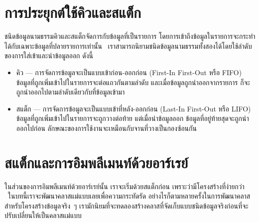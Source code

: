 \section{การ{\wbr}ประยุกต์{\wbr}ใช้{\wbr}คิว{\wbr}และ{\wbr}สแต็ก}

ชนิด{\wbr}ข้อมูล{\wbr}นามธรรม{\wbr}คิว{\wbr}และ{\wbr}สแต็ก{\wbr}จัดการ{\wbr}กับ{\wbr}ข้อมูล{\wbr}ที่{\wbr}เป็น{\wbr}รายการ{\wbr}
โดย{\wbr}การ{\wbr}เข้าถึง{\wbr}ข้อมูล{\wbr}ใน{\wbr}รายการ{\wbr}จะ{\wbr}กระทำ{\wbr}ได้{\wbr}กับ{\wbr}เฉพาะ{\wbr}ข้อมูล{\wbr}ที่{\wbr}ปลาย{\wbr}รายการ{\wbr}เท่านั้น \
เรา{\wbr}สามารถ{\wbr}นิยาม{\wbr}ชนิด{\wbr}ข้อมูล{\wbr}นามธรรม{\wbr}ทั้ง{\wbr}สอง{\wbr}ได้{\wbr}โดย{\wbr}ใช้{\wbr}ลำดับ{\wbr}ของ{\wbr}การ{\wbr}ใส่{\wbr}เข้า{\wbr}และ{\wbr}นำ{\wbr}ข้อมูล{\wbr}ออก ดังนี้{\wbr}
\begin{itemize}
\item คิว --- การ{\wbr}จัดการ{\wbr}ข้อมูล{\wbr}จะ{\wbr}เป็น{\wbr}แบบ{\wbr}เข้า{\wbr}ก่อน-ออก{\wbr}ก่อน (First-In First-Out หรือ{\wbr}
  FIFO) ข้อมูล{\wbr}ที่{\wbr}ถูก{\wbr}เพิ่ม{\wbr}เข้า{\wbr}ไป{\wbr}ใน{\wbr}รายการ{\wbr}จะ{\wbr}ต่อ{\wbr}แถว{\wbr}กัน{\wbr}ตาม{\wbr}ลำดับ{\wbr}
  และ{\wbr}เมื่อ{\wbr}ข้อมูล{\wbr}ถูก{\wbr}นำ{\wbr}ออก{\wbr}จาก{\wbr}รายการ ก็{\wbr}จะ{\wbr}ถูก{\wbr}นำ{\wbr}ออก{\wbr}ไป{\wbr}ตาม{\wbr}ลำดับ{\wbr}เดียวกับ{\wbr}ที่{\wbr}ข้อมูล{\wbr}เข้า{\wbr}มา{\wbr}
\item สแต็ก --- การ{\wbr}จัดการ{\wbr}ข้อมูล{\wbr}จะ{\wbr}เป็น{\wbr}แบบ{\wbr}เข้าที่{\wbr}หลัง-ออก{\wbr}ก่อน (Last-In First-Out
  หรือ LIFO) ข้อมูล{\wbr}ที่{\wbr}ถูก{\wbr}เพิ่ม{\wbr}เข้า{\wbr}ไป{\wbr}ใน{\wbr}รายการ{\wbr}จะ{\wbr}ถูก{\wbr}วาง{\wbr}ต่อท้าย แต่{\wbr}เมื่อ{\wbr}นำ{\wbr}ข้อมูล{\wbr}ออก{\wbr}
  ข้อมูล{\wbr}ที่อยู่{\wbr}ท้าย{\wbr}สุด{\wbr}จะ{\wbr}ถูก{\wbr}นำ{\wbr}ออก{\wbr}ไป{\wbr}ก่อน{\wbr}
  ลักษณะ{\wbr}ของ{\wbr}การ{\wbr}ใช้{\wbr}งาน{\wbr}จะ{\wbr}เหมือน{\wbr}กับ{\wbr}จาน{\wbr}ที่{\wbr}วาง{\wbr}เป็น{\wbr}กอง{\wbr}ซ้อน{\wbr}กัน{\wbr}
\end{itemize}


\section{สแต็ก{\wbr}และ{\wbr}การ{\wbr}อิม{\wbr}พลี{\wbr}เมนท์{\wbr}ด้วย{\wbr}อาร์เรย์}

ใน{\wbr}ส่วน{\wbr}ของ{\wbr}การ{\wbr}อิม{\wbr}พลี{\wbr}เมนท์{\wbr}ด้วย{\wbr}อาร์เรย์{\wbr}นั้น เรา{\wbr}จะ{\wbr}เริ่ม{\wbr}ด้วย{\wbr}สแต็ก{\wbr}ก่อน{\wbr}
เพราะว่า{\wbr}มี{\wbr}โครงสร้าง{\wbr}ที่{\wbr}ง่าย{\wbr}กว่า \ ใน{\wbr}บท{\wbr}นี้{\wbr}เรา{\wbr}จะ{\wbr}พัฒนา{\wbr}ค{\wbr}ลา{\wbr}ส{\wbr}แม่แบบ{\wbr}เลย{\wbr}เพื่อ{\wbr}ความ{\wbr}กระ{\wbr}ทัด{\wbr}รัด{\wbr}
อย่างไรก็ตาม{\wbr}หลาย{\wbr}ครั้ง{\wbr}ใน{\wbr}การ{\wbr}พัฒนา{\wbr}ค{\wbr}ลา{\wbr}ส{\wbr}สำหรับ{\wbr}โครงสร้าง{\wbr}ข้อมูล{\wbr}จริง~ๆ
เรา{\wbr}มัก{\wbr}นิยม{\wbr}ที่{\wbr}จะ{\wbr}ทดลอง{\wbr}สร้าง{\wbr}ค{\wbr}ลา{\wbr}ส{\wbr}ที่{\wbr}จัด{\wbr}เก็บ{\wbr}แบบ{\wbr}ชนิด{\wbr}ข้อมูล{\wbr}จริง{\wbr}ก่อน{\wbr}ที่{\wbr}จะ{\wbr}ปรับ{\wbr}เปลี่ยน{\wbr}ให้{\wbr}เป็น{\wbr}ค{\wbr}ลา{\wbr}ส{\wbr}แม่แบบ{\wbr}

